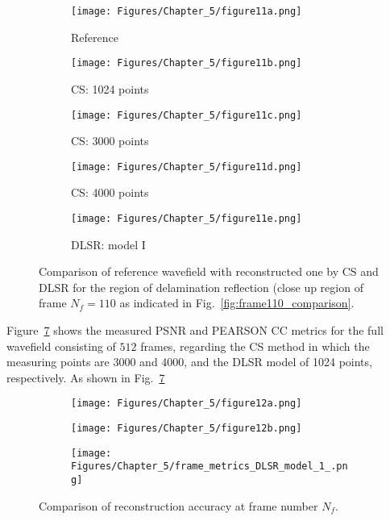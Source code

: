 \begin{figure} [h!]
	\centering
	\begin{subfigure}[b]{0.32\textwidth}
		\centering
		\texttt{[image: Figures/Chapter\_5/figure11a.png]}
		\caption{Reference}
		\label{fig:frame110delam_ref}
	\end{subfigure}
	\hfill
	\begin{subfigure}[b]{0.32\textwidth}
		\centering
		\texttt{[image: Figures/Chapter\_5/figure11b.png]}
		\caption{CS: 1024 points}
		\label{fig:frame110delam_CS1024}
	\end{subfigure}
	\hfill
	\begin{subfigure}[b]{0.32\textwidth}
		\centering
		\texttt{[image: Figures/Chapter\_5/figure11c.png]}
		\caption{CS: 3000 points}
		\label{fig:frame110delam_CS3000}
	\end{subfigure}	
	\hfill
	\begin{subfigure}[b]{0.32\textwidth}
		\centering
		\texttt{[image: Figures/Chapter\_5/figure11d.png]}
		\caption{CS: 4000 points}
		\label{fig:frame110delam_CS4000}
	\end{subfigure}
	\begin{subfigure}[b]{0.32\textwidth}
		\centering
		\texttt{[image: Figures/Chapter\_5/figure11e.png]}
		\caption{DLSR: model I}
		\label{fig:frame110delam_Abdalraheem}
	\end{subfigure}
	\caption{Comparison of reference wavefield with reconstructed one by CS and DLSR for the region of delamination reflection (close up region of frame $N_f = 110$ as indicated in Fig.~\ref{fig:frame110_comparison}.}
	\label{fig:frame110del_comparison}
\end{figure} 
\clearpage
Figure~\ref{fig:frame_metrics} shows the measured PSNR and PEARSON CC metrics for the full wavefield consisting of $512$ frames, regarding the CS method in which the measuring points are 3000 and 4000, and the DLSR model of 1024 points, respectively.
As shown in Fig.~\ref{fig:frame_metrics} 
\begin{figure} [h!]
	\centering
	\begin{subfigure}[b]{1\textwidth}
		\centering
		\texttt{[image: Figures/Chapter\_5/figure12a.png]}
	\end{subfigure}
	\vfill
	\begin{subfigure}[b]{1\textwidth}
		\centering
		\texttt{[image: Figures/Chapter\_5/figure12b.png]}
	\end{subfigure}
	\vfill
	\begin{subfigure}[b]{1\textwidth}
		\centering
		\texttt{[image: Figures/Chapter\_5/frame\_metrics\_DLSR\_model\_1\_.png]}
	\end{subfigure}	
	\caption{Comparison of reconstruction accuracy at frame number $N_f$.}
	\label{fig:frame_metrics}
\end{figure}

